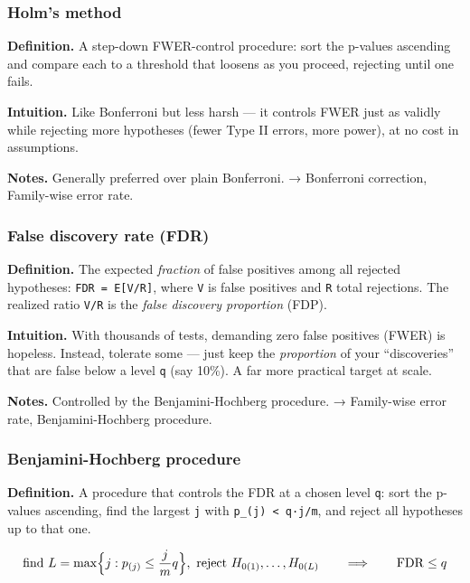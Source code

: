 \documentclass[
  10pt,
  letterpaper,
  onecolumn]{article}
\begin{document}
\hypertarget{holms-method}{%
\subsubsection{Holm's method}\label{holms-method}}

\textbf{Definition.} A step-down FWER-control procedure: sort the
p-values ascending and compare each to a threshold that loosens as you
proceed, rejecting until one fails.

\textbf{Intuition.} Like Bonferroni but less harsh --- it controls FWER
just as validly while rejecting more hypotheses (fewer Type II errors,
more power), at no cost in assumptions.

\textbf{Notes.} Generally preferred over plain Bonferroni. → Bonferroni
correction, Family-wise error rate.

\hypertarget{false-discovery-rate-fdr}{%
\subsubsection{False discovery rate
(FDR)}\label{false-discovery-rate-fdr}}

\textbf{Definition.} The expected \emph{fraction} of false positives
among all rejected hypotheses: \texttt{FDR\ =\ E{[}V/R{]}}, where
\texttt{V} is false positives and \texttt{R} total rejections. The
realized ratio \texttt{V/R} is the \emph{false discovery proportion}
(FDP).

\textbf{Intuition.} With thousands of tests, demanding zero false
positives (FWER) is hopeless. Instead, tolerate some --- just keep the
\emph{proportion} of your ``discoveries'' that are false below a level
\texttt{q} (say 10\%). A far more practical target at scale.

\textbf{Notes.} Controlled by the Benjamini-Hochberg procedure. →
Family-wise error rate, Benjamini-Hochberg procedure.

\hypertarget{benjamini-hochberg-procedure}{%
\subsubsection{Benjamini-Hochberg
procedure}\label{benjamini-hochberg-procedure}}

\textbf{Definition.} A procedure that controls the FDR at a chosen level
\texttt{q}: sort the p-values ascending, find the largest \texttt{j}
with \texttt{p\_(j)\ \textless{}\ q·j/m}, and reject all hypotheses up
to that one.

\begin{equation*}
\text{find } L=\max\Bigl\{j: p_{(j)}\le \frac{j}{m}q\Bigr\},\ \text{reject } H_{0(1)},\dots,H_{0(L)}
\qquad\Longrightarrow\qquad \mathrm{FDR}\le q
\end{equation*}
\end{document}
